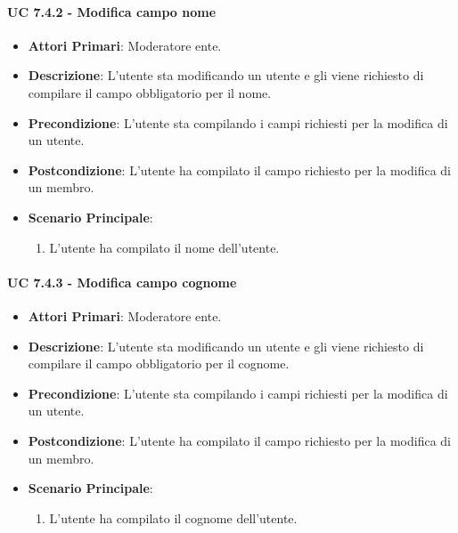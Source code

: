 			\paragraph{UC 7.4.2 - Modifica campo nome}
			\begin{itemize}
				\item \textbf{Attori Primari}: Moderatore ente.
				\item \textbf{Descrizione}: L'utente sta modificando un utente e gli viene richiesto di compilare il campo obbligatorio per il nome.
				\item \textbf{Precondizione}: L'utente sta compilando i campi richiesti per la modifica di un utente.
				\item \textbf{Postcondizione}: L'utente ha compilato il campo richiesto per la modifica di un membro.
				\item \textbf{Scenario Principale}:
				\begin{enumerate}
					\item{L'utente ha compilato il nome dell'utente.}
				\end{enumerate}	
			\end{itemize}

			\paragraph{UC 7.4.3 - Modifica campo cognome}
			\begin{itemize}
				\item \textbf{Attori Primari}: Moderatore ente.
				\item \textbf{Descrizione}: L'utente sta modificando un utente e gli viene richiesto di compilare il campo obbligatorio per il cognome.
				\item \textbf{Precondizione}: L'utente sta compilando i campi richiesti per la modifica di un utente.
				\item \textbf{Postcondizione}: L'utente ha compilato il campo richiesto per la modifica di un membro.
				\item \textbf{Scenario Principale}:
				\begin{enumerate}
					\item{L'utente ha compilato il cognome dell'utente.}
				\end{enumerate}	
			\end{itemize}

			
